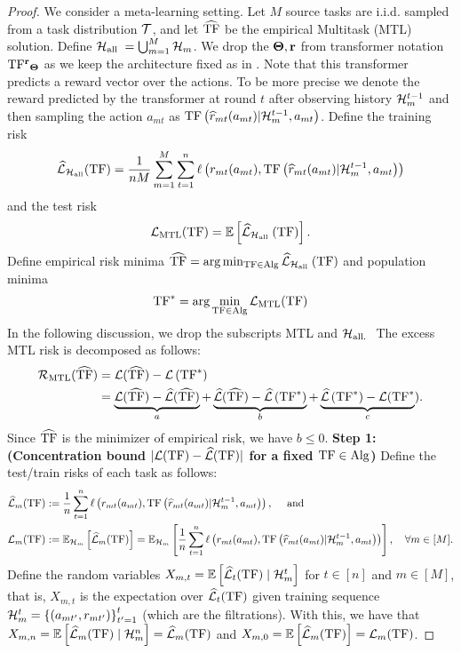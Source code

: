 \documentclass[10pt]{article}
\theoremstyle{plain}
\theoremstyle{definition}
\theoremstyle{remark}
\begin{document}
\begin{proof}
We consider a meta-learning setting. Let $M$ source tasks are i.i.d. sampled from a task distribution $\mathcal{T}$, and let $\widehat{\mathrm{TF}}$ be the empirical Multitask (MTL) solution.
Define $\mathcal{H}_{\text {all }}=\bigcup_{m=1}^M \mathcal{H}_m$. We drop the $\mathbf{\Theta}, \mathbf{r}$ from transformer notation $\mathrm{TF^{\mathbf{r}}}_{\mathbf{\Theta}}$ as we keep the architecture fixed as in \citet{lin2023transformers}.
Note that this transformer predicts a reward vector over the actions. To be more precise we denote the reward predicted by the transformer at round $t$ after observing history $\mathcal{H}_m^{t-1}$ and then sampling the action $a_{mt}$ as $\mathrm{TF}\left(\widehat{r}_{m t}(a_{mt})|\mathcal{H}_m^{t-1}, a_{m t}\right)$.
Define the  training risk $$\widehat{\mathcal{L}}_{\mathcal{H}_{\mathrm{all}}}(\mathrm{TF})=\frac{1}{n M} \sum_{m=1}^M \sum_{t=1}^n \ell\left(r_{m t}(a_{mt}), \mathrm{TF}\left(\widehat{r}_{m t}(a_{mt})|\mathcal{H}_m^{t-1}, a_{m t}\right)\right)$$ and the test risk $$\mathcal{L}_{\mathrm{MTL}}(\mathrm{TF})=\mathbb{E}\left[\widehat{\mathcal{L}}_{\mathcal{H}_{\text {all }}}(\mathrm{TF})\right].$$
Define empirical risk minima $\widehat{\mathrm{TF}}=\arg \min _{\mathrm{TF} \in \mathrm{Alg}} \widehat{\mathcal{L}}_{\mathcal{H}_{\text {all }}}(\mathrm{TF})$ and population minima
\begin{align*}
    \mathrm{TF}^{*}=\arg \min _{\mathrm{TF} \in \mathrm{Alg}} \mathcal{L}_{\mathrm{MTL}}(\mathrm{TF})
\end{align*}
In the following discussion, we drop the subscripts MTL and $\mathcal{H}_{\text {all. }}$ The excess MTL risk is decomposed as follows:
\begin{align*}
\mathcal{R}_{\mathrm{MTL}}(\widehat{\mathrm{TF}}) & =\mathcal{L}(\widehat{\mathrm{TF}})-\mathcal{L}\left(\mathrm{TF}^*\right) \\
& =\underbrace{\mathcal{L}(\widehat{\mathrm{TF}})-\widehat{\mathcal{L}}(\widehat{\mathrm{TF}})}_a+\underbrace{\widehat{\mathcal{L}}(\widehat{\mathrm{TF}})-\widehat{\mathcal{L}}\left(\mathrm{TF}^*\right)}_b+\underbrace{\widehat{\mathcal{L}}\left(\mathrm{TF}^*\right)-\mathcal{L}(\mathrm{TF}^*}_c) .
\end{align*}
Since $\widehat{\mathrm{TF}}$ is the minimizer of empirical risk, we have $b \leq 0$.
\textbf{Step 1: (Concentration bound $|\mathcal{L}(\mathrm{TF})-\widehat{\mathcal{L}}(\mathrm{TF})|$ for a fixed $\mathrm{TF} \in \mathrm{Alg}$)} Define the test/train risks of each task as follows:
\begin{align*}
& \widehat{\mathcal{L}}_m(\mathrm{TF}):=\frac{1}{n} \sum_{t=1}^n \ell\left(r_{mt}(a_{mt}), \mathrm{TF}\left(\widehat{r}_{mt}(a_{mt})|\mathcal{H}_m^{t-1}, a_{m t}\right)\right), \quad \text { and } \\
& \mathcal{L}_m(\mathrm{TF}):=\mathbb{E}_{\mathcal{H}_m}\left[\widehat{\mathcal{L}}_m(\mathrm{TF})\right]=\mathbb{E}_{\mathcal{H}_m}\left[\frac{1}{n} \sum_{t=1}^n \ell\left(r_{mt}(a_{mt}), \mathrm{TF}\left(\widehat{r}_{mt}(a_{mt})|\mathcal{H}_m^{t-1}, a_{m t}\right)\right)\right], \quad \forall m \in[M] .
\end{align*}
Define the random variables $X_{m, t}=\mathbb{E}\left[\widehat{\mathcal{L}}_t(\mathrm{TF}) \mid \mathcal{H}_m^t\right]$ for $t \in[n]$ and $m \in[M]$, that is, $X_{m, t}$ is the expectation over $\widehat{\mathcal{L}}_t(\mathrm{TF})$ given training sequence $\mathcal{H}_m^t=\left\{\left(a_{m t'}, r_{m t'}\right)\right\}_{t'=1}^t$ (which are the filtrations). With this, we have that $X_{m, n}=\mathbb{E}\left[\widehat{\mathcal{L}}_m(\mathrm{TF}) \mid \mathcal{H}_m^n\right]=\widehat{\mathcal{L}}_m(\mathrm{TF})$ and $X_{m, 0}=\mathbb{E}\left[\widehat{\mathcal{L}}_m(\mathrm{TF})\right]=\mathcal{L}_m(\mathrm{TF})$.

\end{proof}
\end{document}
